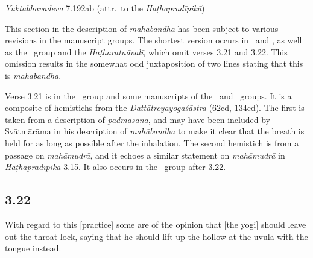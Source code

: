\begin{ekdosis}
\begin{testimonia}[hp03_021]
\emph{Yuktabhavadeva} 7.192ab (attr.~to the \emph{Haṭhapradīpikā})
\begin{versinnote}
\end{versinnote}
\end{testimonia}

\begin{philcomm}[hp03_021]
This section in the description of \emph{mahābandha} has been subject to various revisions in the manuscript groups. The shortest version occurs in \alphaOne\ and \alphaTwo, as well as the \textbeta\ group and the \emph{Haṭharatnāvalī}, which omit verses 3.21 and 3.22. This omission results in the somewhat odd juxtaposition of two lines stating that this is \emph{mahābandha}. \lb

Verse 3.21 is in the \textgamma\ group and some manuscripts of the \textbeta\ and \texteta\ groups. It is a composite of hemistichs from the \emph{Dattātreyayogaśāstra} (62cd, 134cd). The first is taken from a description of \emph{padmāsana}, and may have been included by Svātmārāma in his description of \emph{mahābandha} to make it clear that the breath is held for as long as possible after the inhalation. The second hemistich is from a passage on \emph{mahāmudrā}, and it echoes a similar statement on \emph{mahāmudrā} in \emph{Haṭhapradīpikā} 3.15. It also occurs in the \textalpha\ group after 3.22.
\end{philcomm}



\subsection*{3.22}
\begin{translation}[hp03_022]
With regard to this [practice] some are of the opinion that [the yogi] should leave out the throat lock, saying that he should lift up the hollow at the uvula with the tongue instead.
\end{translation}


\end{ekdosis}
